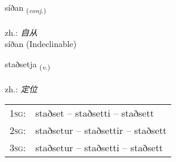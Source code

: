 \documentclass[frontgrid, backgrid]{flacards}\usepackage[]{graphicx}\usepackage[]{xcolor}
\begin{document}
\renewcommand{\flhead}{\vskip5pt \fboxsep=0pt {\small\bfseries\footnotesize Samtenging | 连词}}
\renewcommand{\fcfoot}{\vskip5pt \fboxsep=0pt \hspace{2pt}{\small\bfseries\footnotesize 3K}}

\renewcommand{\blhead}{\vskip5pt {\small\bfseries\footnotesize Samtenging | 连词 }}
\renewcommand{\bcfoot}{\vskip5pt \hspace{2pt}{\small\bfseries\footnotesize 3K}}


{síðan \small{\textsubscript{(\textit{conj.})}} \\[1ex]
\textphonetic{[siːðan]} \\
zh.: \emph{自从} \\  [2ex]
síðan (Indeclinable)}

\renewcommand{\flhead}{\vskip5pt \fboxsep=0pt {\small\bfseries\footnotesize Sagnorð | 动词}}
\renewcommand{\fcfoot}{\vskip5pt \fboxsep=0pt \hspace{2pt}{\small\bfseries\footnotesize 3K}}

\renewcommand{\blhead}{\vskip5pt {\small\bfseries\footnotesize Sagnorð | 动词 }}
\renewcommand{\bcfoot}{\vskip5pt \hspace{2pt}{\small\bfseries\footnotesize 3K}}


{staðsetja \small{\textsubscript{(\textit{v.})}} \\[1ex] %
\textphonetic{[staðsɛtja]} \\
zh.: \emph{定位} \\  [2ex]
\renewcommand*{\arraystretch}{0.8}
\begin{tabular}{p{1cm}l}
\textsc{1sg}: & staðset -- staðsetti -- staðsett \\ 
\textsc{2sg}: & staðsetur -- staðsettir -- staðsett \\ 
\textsc{3sg}: & staðsetur -- staðsetti -- staðsett \\ 
\end{tabular}
}

\renewcommand{\flhead}{\vskip5pt \fboxsep=0pt {\small\bfseries\footnotesize Lýsingarorð | 形容词}}
\renewcommand{\fcfoot}{\vskip5pt \fboxsep=0pt \hspace{2pt}{\small\bfseries\footnotesize 3K}}
\end{document}

